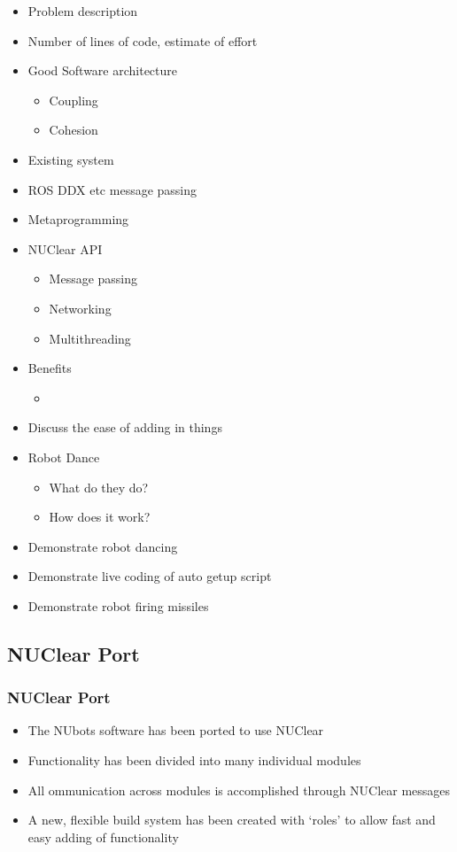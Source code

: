 \documentclass{beamer}
\begin{document}
\begin{frame}
\begin{itemize}
	\item Problem description
	\item Number of lines of code, estimate of effort
	\item Good Software architecture
	\begin{itemize}
		\item Coupling
		\item Cohesion
	\end{itemize}
	\item Existing system
	\item ROS DDX etc message passing
	\item Metaprogramming
	\item NUClear API
	\begin{itemize}
		\item Message passing
		\item Networking
		\item Multithreading
	\end{itemize}
	\item Benefits
	\begin{itemize}
		\item 
	\end{itemize}
	\item Discuss the ease of adding in things
	\item Robot Dance
	\begin{itemize}
		\item What do they do?
		\item How does it work?
	\end{itemize}
	\item Demonstrate robot dancing
	\item Demonstrate live coding of auto getup script
	\item Demonstrate robot firing missiles
\end{itemize}
\end{frame}

\subsection{NUClear Port}
\begin{frame}
	\frametitle{NUClear Port}

	\begin{itemize}
		\item The NUbots software has been ported to use NUClear
		\item Functionality has been divided into many individual modules
		\item All ommunication across modules is accomplished through NUClear messages
		\item A new, flexible build system has been created with `roles' to allow fast and easy adding of functionality
	\end{itemize}
\end{frame}
\end{document}
